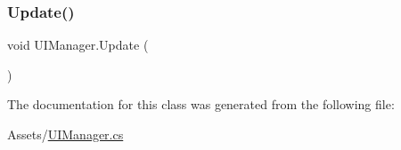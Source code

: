 \subsubsection{\texorpdfstring{Update()}{Update()}}
{\footnotesize\ttfamily void U\+I\+Manager.\+Update (\begin{DoxyParamCaption}{ }\end{DoxyParamCaption})\hspace{0.3cm}{\ttfamily [private]}}



The documentation for this class was generated from the following file\+:\begin{DoxyCompactItemize}
\item 
Assets/\hyperlink{_u_i_manager_8cs}{U\+I\+Manager.\+cs}\end{DoxyCompactItemize}
